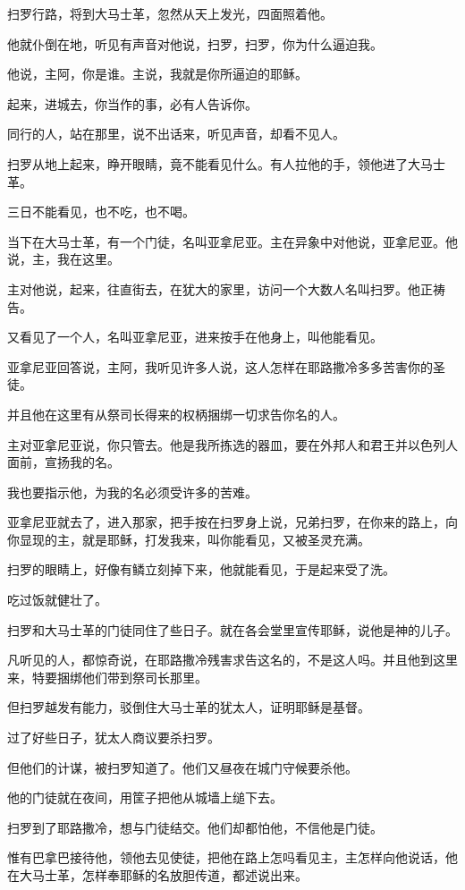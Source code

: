 \documentclass[12pt,oneside]{book}
\begin{document}
扫罗行路，将到大马士革，忽然从天上发光，四面照着他。

他就仆倒在地，听见有声音对他说，扫罗，扫罗，你为什么逼迫我。

他说，主阿，你是谁。主说，我就是你所逼迫的耶稣。

起来，进城去，你当作的事，必有人告诉你。

同行的人，站在那里，说不出话来，听见声音，却看不见人。

扫罗从地上起来，睁开眼睛，竟不能看见什么。有人拉他的手，领他进了大马士革。

三日不能看见，也不吃，也不喝。

当下在大马士革，有一个门徒，名叫亚拿尼亚。主在异象中对他说，亚拿尼亚。他说，主，我在这里。

主对他说，起来，往直街去，在犹大的家里，访问一个大数人名叫扫罗。他正祷告。

又看见了一个人，名叫亚拿尼亚，进来按手在他身上，叫他能看见。

亚拿尼亚回答说，主阿，我听见许多人说，这人怎样在耶路撒冷多多苦害你的圣徒。

并且他在这里有从祭司长得来的权柄捆绑一切求告你名的人。

主对亚拿尼亚说，你只管去。他是我所拣选的器皿，要在外邦人和君王并以色列人面前，宣扬我的名。

我也要指示他，为我的名必须受许多的苦难。

亚拿尼亚就去了，进入那家，把手按在扫罗身上说，兄弟扫罗，在你来的路上，向你显现的主，就是耶稣，打发我来，叫你能看见，又被圣灵充满。

扫罗的眼睛上，好像有鳞立刻掉下来，他就能看见，于是起来受了洗。

吃过饭就健壮了。

扫罗和大马士革的门徒同住了些日子。就在各会堂里宣传耶稣，说他是神的儿子。

凡听见的人，都惊奇说，在耶路撒冷残害求告这名的，不是这人吗。并且他到这里来，特要捆绑他们带到祭司长那里。

但扫罗越发有能力，驳倒住大马士革的犹太人，证明耶稣是基督。

过了好些日子，犹太人商议要杀扫罗。

但他们的计谋，被扫罗知道了。他们又昼夜在城门守候要杀他。

他的门徒就在夜间，用筐子把他从城墙上缒下去。

扫罗到了耶路撒冷，想与门徒结交。他们却都怕他，不信他是门徒。

惟有巴拿巴接待他，领他去见使徒，把他在路上怎吗看见主，主怎样向他说话，他在大马士革，怎样奉耶稣的名放胆传道，都述说出来。
\end{document}
